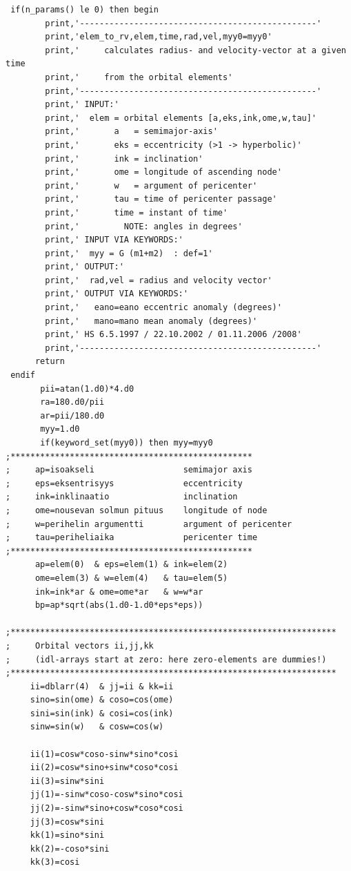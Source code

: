 \documentclass[a4paper,12pt]{article}
\begin{document}
{{{\begin{verbatim}
 if(n_params() le 0) then begin
        print,'------------------------------------------------'
        print,'elem_to_rv,elem,time,rad,vel,myy0=myy0'
        print,'     calculates radius- and velocity-vector at a given time 
        print,'     from the orbital elements'
        print,'------------------------------------------------'
        print,' INPUT:'
        print,'  elem = orbital elements [a,eks,ink,ome,w,tau]'
        print,'       a   = semimajor-axis'
        print,'       eks = eccentricity (>1 -> hyperbolic)'
        print,'       ink = inclination'
        print,'       ome = longitude of ascending node'
        print,'       w   = argument of pericenter'
        print,'       tau = time of pericenter passage' 
        print,'       time = instant of time'
        print,'         NOTE: angles in degrees'
        print,' INPUT VIA KEYWORDS:'
        print,'  myy = G (m1+m2)  : def=1'
        print,' OUTPUT:'
        print,'  rad,vel = radius and velocity vector'
        print,' OUTPUT VIA KEYWORDS:'
        print,'   eano=eano eccentric anomaly (degrees)'
        print,'   mano=mano mean anomaly (degrees)'
        print,' HS 6.5.1997 / 22.10.2002 / 01.11.2006 /2008'
        print,'------------------------------------------------'
      return
 endif
       pii=atan(1.d0)*4.d0
       ra=180.d0/pii
       ar=pii/180.d0
       myy=1.d0
       if(keyword_set(myy0)) then myy=myy0
;*************************************************
;     ap=isoakseli                  semimajor axis
;     eps=eksentrisyys              eccentricity
;     ink=inklinaatio               inclination  
;     ome=nousevan solmun pituus    longitude of node
;     w=perihelin argumentti        argument of pericenter
;     tau=periheliaika              pericenter time
;*************************************************
      ap=elem(0)  & eps=elem(1) & ink=elem(2)
      ome=elem(3) & w=elem(4)   & tau=elem(5)  
      ink=ink*ar & ome=ome*ar   & w=w*ar
      bp=ap*sqrt(abs(1.d0-1.d0*eps*eps))

;******************************************************************
;     Orbital vectors ii,jj,kk  
;     (idl-arrays start at zero: here zero-elements are dummies!)
;******************************************************************
     ii=dblarr(4)  & jj=ii & kk=ii     
     sino=sin(ome) & coso=cos(ome)
     sini=sin(ink) & cosi=cos(ink)
     sinw=sin(w)   & cosw=cos(w)
     
     ii(1)=cosw*coso-sinw*sino*cosi
     ii(2)=cosw*sino+sinw*coso*cosi
     ii(3)=sinw*sini
     jj(1)=-sinw*coso-cosw*sino*cosi
     jj(2)=-sinw*sino+cosw*coso*cosi
     jj(3)=cosw*sini
     kk(1)=sino*sini
     kk(2)=-coso*sini
     kk(3)=cosi


\end{verbatim}}}}
\end{document}
